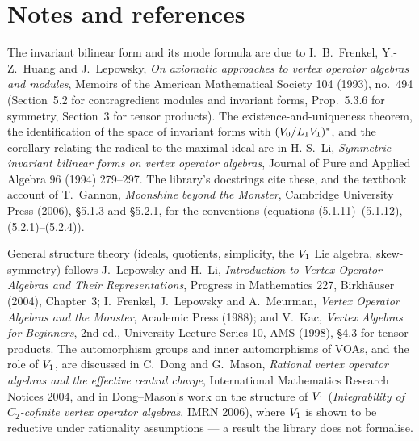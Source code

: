 \section{Notes and references}\label{l04:sec:notes}

The invariant bilinear form and its mode formula are due to I.~B.~Frenkel, Y.-Z.~Huang and
J.~Lepowsky, \emph{On axiomatic approaches to vertex operator algebras and modules}, Memoirs of the
American Mathematical Society 104 (1993), no.~494 (Section~5.2 for contragredient modules and invariant
forms, Prop.~5.3.6 for symmetry, Section~3 for tensor products). The existence-and-uniqueness theorem, the
identification of the space of invariant forms with $(V_0/L_1V_1)^*$, and the corollary relating the
radical to the maximal ideal are in H.-S.~Li, \emph{Symmetric invariant bilinear forms on vertex operator
algebras}, Journal of Pure and Applied Algebra 96 (1994) 279--297. The library's docstrings cite these, and
the textbook account of T.~Gannon, \emph{Moonshine beyond the Monster}, Cambridge University Press (2006),
§5.1.3 and §5.2.1, for the conventions (equations (5.1.11)--(5.1.12), (5.2.1)--(5.2.4)).

General structure theory (ideals, quotients, simplicity, the $V_1$ Lie algebra, skew-symmetry) follows
J.~Lepowsky and H.~Li, \emph{Introduction to Vertex Operator Algebras and Their Representations},
Progress in Mathematics 227, Birkh\"auser (2004), Chapter~3; I.~Frenkel, J.~Lepowsky and A.~Meurman,
\emph{Vertex Operator Algebras and the Monster}, Academic Press (1988); and V.~Kac, \emph{Vertex
Algebras for Beginners}, 2nd ed., University Lecture Series 10, AMS (1998), §4.3 for tensor products. The
automorphism groups and inner automorphisms of VOAs, and the role of $V_1$, are discussed in C.~Dong and
G.~Mason, \emph{Rational vertex operator algebras and the effective central charge}, International
Mathematics Research Notices 2004, and in Dong--Mason's work on
the structure of $V_1$ (\emph{Integrability of $C_2$-cofinite vertex operator algebras}, IMRN 2006), where $V_1$ is shown to be reductive under rationality assumptions --- a result the
library does not formalise.

